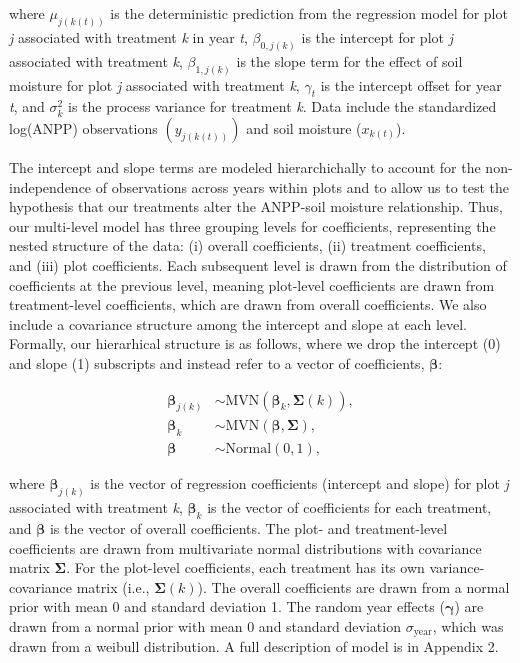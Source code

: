 \documentclass[fleqn,10pt,lineno]{wlpeerj} %
\begin{document}
\noindent{}where \(\mu_{j(k(t))}\) is the deterministic prediction from
the regression model for plot \emph{j} associated with treatment
\emph{k} in year \emph{t}, \(\beta_{0,j(k)}\) is the intercept for plot
\emph{j} associated with treatment \emph{k}, \(\beta_{1,j(k)}\) is the
slope term for the effect of soil moisture for plot \emph{j} associated
with treatment \emph{k}, \(\gamma_t\) is the intercept offset for year
\emph{t}, and \(\sigma^2_k\) is the process variance for treatment
\emph{k}. Data include the standardized log(ANPP) observations
\(\left( y_{j(k(t))} \right)\) and soil moisture (\(x_{k(t)}\)).

The intercept and slope terms are modeled hierarchichally to account for
the non-independence of observations across years within plots and to
allow us to test the hypothesis that our treatments alter the ANPP-soil
moisture relationship. Thus, our multi-level model has three grouping
levels for coefficients, representing the nested structure of the data:
(i) overall coefficients, (ii) treatment coefficients, and (iii) plot
coefficients. Each subsequent level is drawn from the distribution of
coefficients at the previous level, meaning plot-level coefficients are
drawn from treatment-level coefficients, which are drawn from overall
coefficients. We also include a covariance structure among the intercept
and slope at each level. Formally, our hierarhical structure is as
follows, where we drop the intercept (0) and slope (1) subscripts and
instead refer to a vector of coefficients, \(\boldsymbol{\beta}\):

\vspace{-1em}

\begin{align}
\boldsymbol{\beta}_{j(k)} &\sim \text{MVN} \left( \boldsymbol{\beta}_k, \boldsymbol{\Sigma}(k) \right), \\
\boldsymbol{\beta}_{k} &\sim \text{MVN} \left( \boldsymbol{\beta}, \boldsymbol{\Sigma}  \right), \\
\boldsymbol{\beta} &\sim \text{Normal} \left( 0, 1 \right),
\end{align}

\noindent{}where \(\boldsymbol{\beta}_{j(k)}\) is the vector of
regression coefficients (intercept and slope) for plot \emph{j}
associated with treatment \emph{k}, \(\boldsymbol{\beta}_{k}\) is the
vector of coefficients for each treatment, and \(\boldsymbol{\beta}\) is
the vector of overall coefficients. The plot- and treatment-level
coefficients are drawn from multivariate normal distributions with
covariance matrix \(\boldsymbol{\Sigma}\). For the plot-level
coefficients, each treatment has its own variance-covariance matrix
(i.e., \(\boldsymbol{\Sigma}(k)\)). The overall coefficients are drawn
from a normal prior with mean 0 and standard deviation 1. The random
year effects (\(\boldsymbol{\gamma}\)) are drawn from a normal prior
with mean 0 and standard deviation \(\sigma_{\text{year}}\), which was
drawn from a weibull distribution. A full description of model is in
Appendix 2.
\end{document}
